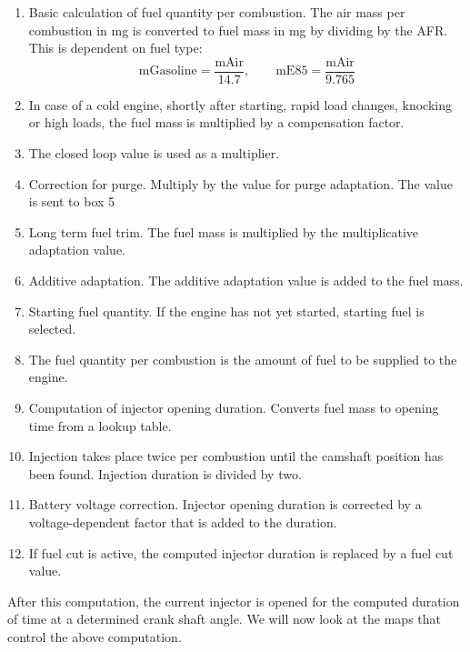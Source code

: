 \documentclass[11pt,a4paper]{book}
\begin{document}
\begin{enumerate}
    \item Basic calculation of fuel quantity per combustion. The air mass per
        combustion in \si{\milli\gram} is converted to fuel mass in
        \si{\milli\gram} by dividing by the AFR. This is dependent on fuel type:
        \begin{equation}
            \text{mGasoline}=\frac{\text{mAir}}{14.7}, \qquad
            \text{mE85}=\frac{\text{mAir}}{9.765}
        \end{equation}
    \item In case of a cold engine, shortly after starting, rapid load changes,
        knocking or high loads, the fuel mass is multiplied by a compensation
        factor.
    \item The closed loop value is used as a multiplier.
    \item Correction for purge. Multiply by the value for purge adaptation. The
        value is sent to box 5
    \item Long term fuel trim. The fuel mass is multiplied by the multiplicative
        adaptation value.
    \item Additive adaptation. The additive adaptation value is added to the
        fuel mass.
    \item Starting fuel quantity. If the engine has not yet started, starting fuel is
        selected.
    \item The fuel quantity per combustion is the amount of fuel to be
        supplied to the engine.
    \item Computation of injector opening duration. Converts fuel mass to
        opening time from a lookup table.
    \item Injection takes place twice per combustion until the
        camshaft position has been found. Injection duration
        is divided by two.
    \item Battery voltage correction. Injector opening duration is corrected
        by a voltage-dependent factor that is added to the duration.
    \item If fuel cut is active, the computed injector duration is replaced by a
        fuel cut value.
\end{enumerate}
After this computation, the current injector is opened for the computed duration
of time at a determined crank shaft angle. We will now look at the maps that
control the above computation.
\end{document}
